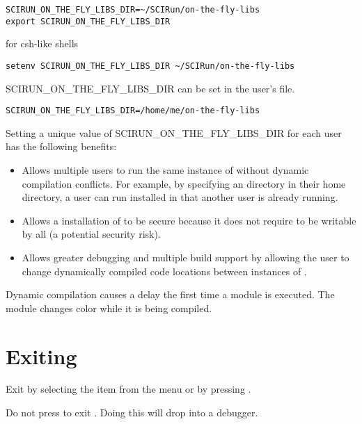 \begin{verbatim}
SCIRUN_ON_THE_FLY_LIBS_DIR=~/SCIRun/on-the-fly-libs
export SCIRUN_ON_THE_FLY_LIBS_DIR
\end{verbatim}

for csh-like shells

\begin{verbatim}
setenv SCIRUN_ON_THE_FLY_LIBS_DIR ~/SCIRun/on-the-fly-libs
\end{verbatim}

SCIRUN\_ON\_THE\_FLY\_LIBS\_DIR can be set in the user's
 file.

\begin{verbatim}
SCIRUN_ON_THE_FLY_LIBS_DIR=/home/me/on-the-fly-libs
\end{verbatim}

Setting a unique value of SCIRUN\_ON\_THE\_FLY\_LIBS\_DIR for each
\sr{} user has the following benefits:

\begin{itemize}
\item Allows multiple users  to run the same 
  instance of \sr{} without
  dynamic compilation conflicts.  For example, by specifying an
   directory in their home directory, a user
  can run \sr{} installed in  that another user
  is already running.

\item Allows a  installation of \sr{}
  to be secure because it does not require
   to be writable by
  all (a potential security risk).

\item Allows greater debugging and multiple build support by
  allowing the user to change dynamically compiled code locations
  between instances of \sr{}.

\end{itemize}

Dynamic compilation causes a delay the first time a module is
executed.  The module changes color while it is being
compiled.

\section{Exiting \sr{}}
\label{sec:stopping}

Exit \sr{} by selecting the  item from the 
menu or by pressing .

Do not press  to exit \sr{}.  Doing this will drop
\sr{} into a debugger.


